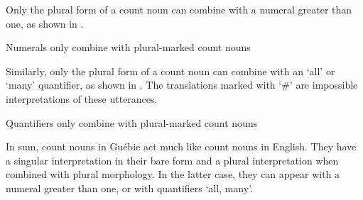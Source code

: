 \documentclass[output=paper,colorlinks,citecolor=brown]{langscibook}
\begin{document}
Only the plural form of a count noun can combine with a numeral greater than one, as shown in .

\ea%
    \label{ex:sande:4}
    Numerals only combine with plural-marked count nouns
    \z
\z

Similarly, only the plural form of a count noun can combine with an `all' or  `many' quantifier, as shown in . The translations marked with `\#' are impossible interpretations of these utterances.

\ea%
    \label{ex:sande:5}
    Quantifiers only combine with plural-marked count nouns
    \z
\z


In sum, count nouns in Guébie act much like count nouns in English. They have a singular interpretation in their bare form and a plural interpretation when combined with plural morphology. In the latter case, they can appear with a numeral greater than one, or with quantifiers `all, many'.
\end{document}
